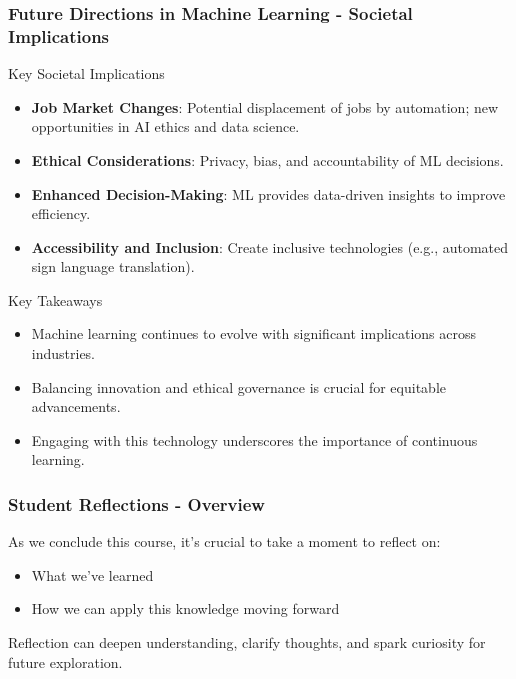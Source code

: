 \documentclass[aspectratio=169]{beamer}
\begin{document}
\begin{frame}[fragile]
    \frametitle{Future Directions in Machine Learning - Societal Implications}
    \begin{block}{Key Societal Implications}
        \begin{itemize}
            \item \textbf{Job Market Changes}: Potential displacement of jobs by automation; new opportunities in AI ethics and data science.
            \item \textbf{Ethical Considerations}: Privacy, bias, and accountability of ML decisions.
            \item \textbf{Enhanced Decision-Making}: ML provides data-driven insights to improve efficiency.
            \item \textbf{Accessibility and Inclusion}: Create inclusive technologies (e.g., automated sign language translation).
        \end{itemize}
    \end{block}

    \begin{block}{Key Takeaways}
        \begin{itemize}
            \item Machine learning continues to evolve with significant implications across industries.
            \item Balancing innovation and ethical governance is crucial for equitable advancements.
            \item Engaging with this technology underscores the importance of continuous learning.
        \end{itemize}
    \end{block}
\end{frame}

\begin{frame}[fragile]
    \frametitle{Student Reflections - Overview}
    As we conclude this course, it’s crucial to take a moment to reflect on:
    \begin{itemize}
        \item What we’ve learned
        \item How we can apply this knowledge moving forward
    \end{itemize}
    Reflection can deepen understanding, clarify thoughts, and spark curiosity for future exploration.
\end{frame}
\end{document}

